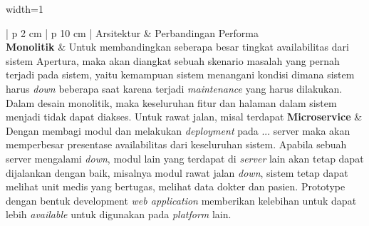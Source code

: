 \begin{enumerate}[leftmargin=*]
		\begin{table}[H]
		\small
		\begin{adjustbox}{width=1\textwidth}
			\begin{tabular}{| p {2 cm} | p {10 cm} |}
				\hline
				Arsitektur & Perbandingan Performa\\
				\hline
				\textbf{Monolitik} & Untuk membandingkan seberapa besar tingkat availabilitas dari sistem Apertura, maka akan diangkat sebuah skenario masalah yang pernah terjadi pada sistem, yaitu kemampuan sistem menangani kondisi dimana sistem harus \textit{down} beberapa saat karena terjadi \textit{maintenance} yang harus dilakukan. Dalam desain monolitik, maka keseluruhan fitur dan halaman dalam sistem menjadi tidak dapat diakses. Untuk rawat jalan, misal terdapat 
				\hline
				\textbf{Microservice} & Dengan membagi modul dan melakukan \textit{deployment} pada ... server maka akan memperbesar presentase availabilitas dari keseluruhan sistem. Apabila sebuah server mengalami \textit{down}, modul lain yang terdapat di \textit{server} lain akan tetap dapat dijalankan dengan baik, misalnya modul rawat jalan \textit{down}, sistem tetap dapat melihat unit medis yang bertugas, melihat data dokter dan pasien. Prototype dengan bentuk development \textit{web application} memberikan kelebihan untuk dapat lebih \textit{available} untuk digunakan pada \textit{platform} lain.\\
				\hline
			\end{tabular}
		\end{adjustbox}
	\end{table}
\end{enumerate}
\newpage